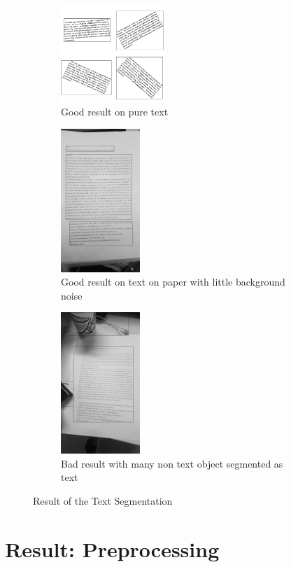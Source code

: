 \documentclass[Report.tex]{subfiles}
\begin{document}
\begin{figure}[ht]
  \centering
  \begin{subfigure}[t]{4cm}
    \includegraphics[width=4cm]{res/segment_text1.png}
    \caption{Good result on pure text}
  \end{subfigure}
  \hspace{7mm}%
  \begin{subfigure}[t]{4cm}
    \includegraphics[width=3cm]{res/segment_text2.png}
    \caption{Good result on text on paper with little background noise}
  \end{subfigure}
  \hspace{5mm}%
  \begin{subfigure}[t]{4cm}
    \includegraphics[width=3cm]{res/segment_text3.png}
    \caption{Bad result with many non text object segmented as text}
  \end{subfigure}
  \caption{Result of the Text Segmentation}
  \label{result:fig:Text_seg_result}
\end{figure}

\section{Result: Preprocessing}
\end{document}
